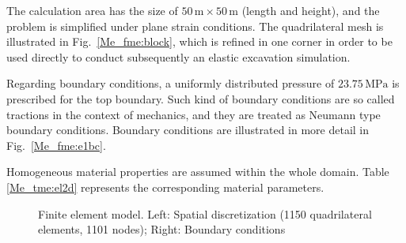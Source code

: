 The calculation area has the size of $50\,\mbox{m}\times 50\,\mbox{m}$ (length and height), and the problem is simplified under plane strain conditions. The quadrilateral mesh is illustrated in Fig.~\ref{Me_fme:block}, which is refined in one corner in order to be used directly to conduct subsequently an elastic excavation simulation.

Regarding boundary conditions, a uniformly distributed pressure of $23.75\,\mbox{MPa}$ is prescribed for the top boundary. Such kind of boundary conditions are so called tractions in the context of mechanics, and they are treated as Neumann type boundary conditions. Boundary conditions are illustrated in more detail in Fig.~\ref{Me_fme:e1bc}.

Homogeneous material properties are assumed within the whole domain. Table \ref{Me_tme:el2d} represents the corresponding material parameters.

\clearpage

\begin{figure}[!htb]
  \centering
  \caption{Finite element model. Left: Spatial discretization (1150 quadrilateral elements, 1101 nodes); Right: Boundary conditions}
  \label{Me_fme:meshbc}
\end{figure}


